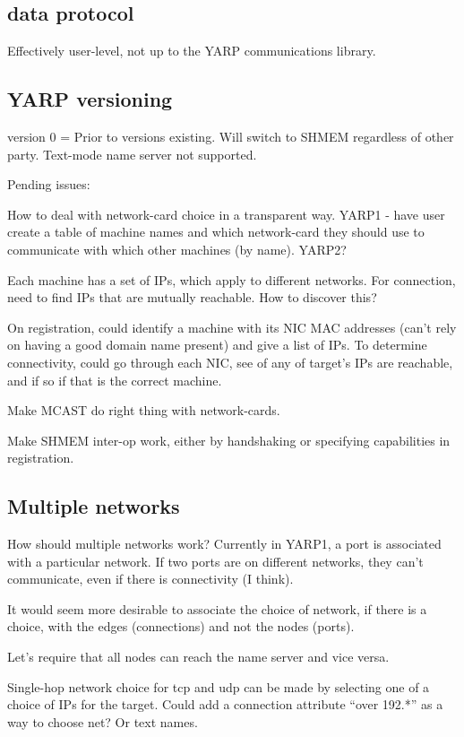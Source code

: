 \subsection{data protocol}

Effectively user-level, not up to the YARP communications library.


\subsection{YARP versioning}


version 0 = Prior to versions existing.
Will switch to SHMEM regardless of other party.
Text-mode name server not supported.

Pending issues: 

How to deal with network-card choice in a transparent
way.  YARP1 - have user create a table of machine names and which
network-card they should use to communicate with which other machines
(by name).  YARP2?  

Each machine has a set of IPs, which apply to different networks.
For connection, need to find IPs that are mutually reachable.
How to discover this?

On registration, could identify a machine with its NIC 
MAC addresses (can't rely on having a good domain name present)
and give a list of IPs.  To determine connectivity, could go
through each NIC, see of any of target's IPs are reachable,
and if so if that is the correct machine.


Make MCAST do right thing with network-cards.

Make SHMEM inter-op work, either by handshaking or specifying 
capabilities in registration.


\subsection{Multiple networks}

How should multiple networks work?  Currently in YARP1, a port is
associated with a particular network.  If two ports are on different
networks, they can't communicate, even if there is connectivity
(I think).

It would seem more desirable to associate the choice of network,
if there is a choice, with the edges (connections) and not the
nodes (ports).

Let's require that all nodes can reach the name server and vice
versa.

Single-hop network choice for tcp and udp can be made by selecting one
of a choice of IPs for the target.  Could add a connection attribute
``over 192.*'' as a way to choose net?  Or text names.


